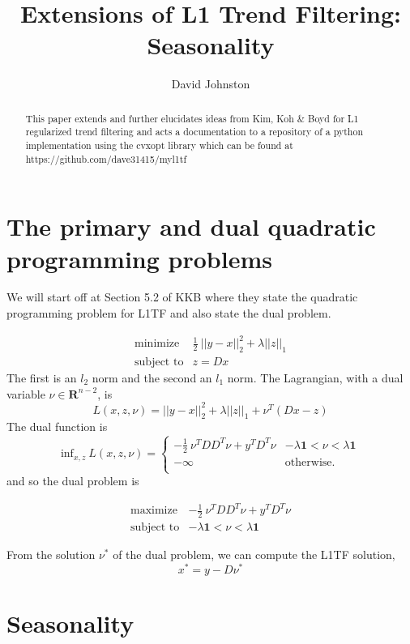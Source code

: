 \documentclass{article}
\begin{document}
\title{Extensions of L1 Trend Filtering: Seasonality}
\author{David Johnston}

\maketitle

\begin{abstract}
This paper extends and further elucidates ideas from Kim, Koh \& Boyd for L1 regularized
trend filtering and acts a documentation to a repository of a python
implementation using the cvxopt library which can be found at https://github.com/dave31415/myl1tf
\end{abstract}

\section{The primary and dual quadratic programming problems}

We will start off at Section 5.2 of KKB where they state the quadratic programming problem for L1TF
and also state the dual problem.

\begin{eqnarray}
\mbox{minimize} & \frac{1}{2} ~ || y - x ||_2^2  + \lambda ||z||_1 \\
\mbox{subject to} & z = D x
\end{eqnarray}
The first is an $l_2$ norm and the second an $l_1$ norm. The Lagrangian, with a dual variable $\nu \in \mathbf{R}^{n-2}$, is
\[
L(x,z,\nu) =  || y - x ||_2^2  + \lambda ||z||_1 + \nu^T (D x -z)
\]
The dual function is
\[
\mbox{inf}_{x,z} ~ L(x,z,\nu) =
    \left\{
    \begin{array}{ll}
    - \frac{1}{2} ~ \nu^T D D^T \nu + y^T D^T \nu &  - \lambda \mathbf{1} < \nu < \lambda \mathbf{1} \\
  -\infty  & \mbox{otherwise.} \\
  \end{array}
  \right.
\]
and so the dual problem is

\begin{eqnarray}
\mbox{maximize} & -\frac{1}{2} ~ \nu^T D D^T \nu + y^T D^T \nu \\
\mbox{subject to} & - \lambda \mathbf{1} < \nu < \lambda \mathbf{1}
\end{eqnarray}

From the solution $\nu^*$ of the dual problem, we can compute the L1TF solution,
\[
x^* = y - D \nu^*
\]

\section{Seasonality}
\end{document}

